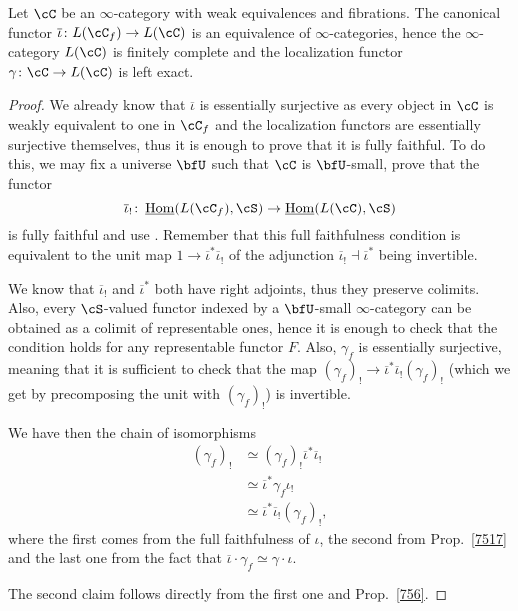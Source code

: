 \begin{prop}\label{7518}

  Let $\cC$ be an $\infty$-category with weak equivalences and fibrations. The
  canonical functor $\overline{\iota}\colon L(\cC_f)\rightarrow L(\cC)$ is an
  equivalence of $\infty$-categories, hence the $\infty$-category $L(\cC)$ is
  finitely complete and the localization functor $\gamma\colon\cC\rightarrow
  L(\cC)$ is left exact.
\end{prop}
\begin{proof}

  We already know that $\overline{\iota}$ is essentially surjective as every
  object in $\cC$ is weakly equivalent to one in $\cC_f$ and the localization
  functors are essentially surjective themselves, thus it is enough to prove
  that it is fully faithful. To do this, we may fix a universe $\bfU$ such that
  $\cC$ is $\bfU$-small, prove that the functor
  \[\overline{\iota}_!\colon\home(L(\cC_f),\cS)\rightarrow\home(L(\cC),\cS)\]
  is fully faithful and use \cite[Prop.\ 6.1.15]{Cis19}. Remember that this full
  faithfulness condition is equivalent to the unit map
  $1\rightarrow\overline{\iota}^*\overline{\iota}_!$ of the adjunction
  $\overline{\iota}_!\dashv\overline{\iota}^*$ being invertible.

  We know that $\overline{\iota}_!$ and $\overline{\iota}^*$ both have right
  adjoints, thus they preserve colimits. Also, every $\cS$-valued functor
  indexed by a $\bfU$-small $\infty$-category can be obtained as a colimit of
  representable ones, hence it is enough to check that the condition holds for
  any representable functor $F$. Also, $\gamma_f$ is essentially surjective,
  meaning that it is sufficient to check that the map
  $(\gamma_f)_!\rightarrow\overline{\iota}^*\overline{\iota}_!(\gamma_f)_!$
  (which we get by precomposing the unit with $(\gamma_f)_!$) is invertible.

  We have then the chain of isomorphisms
  \begin{align*}
    (\gamma_f)_! &\simeq(\gamma_f)_!\overline{\iota}^*\overline{\iota}_! \\
                 &\simeq\overline{\iota}^*\gamma_f\iota_! \\
                 &\simeq\overline{\iota}^*\overline{\iota}_!(\gamma_f)_!,
  \end{align*}
  where the first comes from the full faithfulness of $\iota$, the
  second from Prop.\ \ref{7517} and the last one from the fact that
  $\overline{\iota}\cdot\gamma_f\simeq\gamma\cdot\iota$.

  The second claim follows directly from the first one and Prop.\ \ref{756}.
\end{proof}

